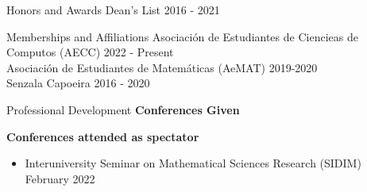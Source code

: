 \documentclass{resume} %
\begin{document}
\begin{rSection}{Honors and Awards}
    Dean's List \hfill{2016 - 2021}
\end{rSection}

\begin{rSection}{Memberships and Affiliations}
    Asociaci\'on de Estudiantes de Ciencieas de Computos (AECC) \hfill{2022 - Present} \\
    Asociaci\'on de Estudiantes de Matem\'aticas (AeMAT) \hfill{2019-2020} \\
    Senzala Capoeira \hfill{2016 - 2020} \\
\end{rSection}


\begin{rSection}{Professional Development}
    \textbf{Conferences Given}
    \textbf{Conferences attended as spectator}
    \begin{itemize}
        \item Interuniversity Seminar on Mathematical Sciences Research (SIDIM)
        \hfill{February 2022}
    \end{itemize}

\end{rSection}
\end{document}
